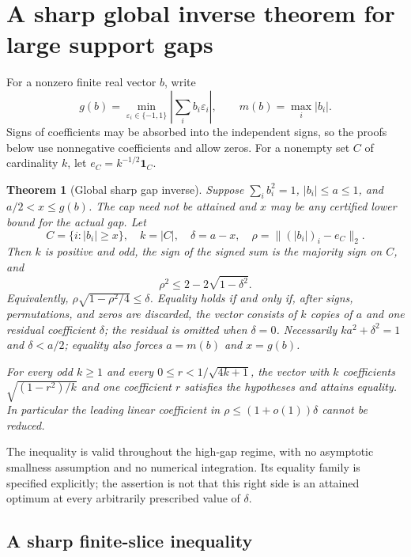 \documentclass[11pt]{article}
\newtheorem{theorem}{Theorem}[section]
\theoremstyle{remark}\newtheorem{remark}[theorem]{Remark}
\begin{document}
\section{A sharp global inverse theorem for large support gaps}
\label{sec:sharp-gap-rigidity}

For a nonzero finite real vector $b$, write
\[
 g(b)=\min_{\varepsilon_i\in\{-1,1\}}\left|\sum_i b_i\varepsilon_i\right|,
 \qquad m(b)=\max_i|b_i|.
\]
Signs of coefficients may be absorbed into the independent signs, so the
proofs below use nonnegative coefficients and allow zeros.  For a nonempty
set $C$ of cardinality $k$, let $e_C=k^{-1/2}\mathbf1_C$.

\begin{theorem}[Global sharp gap inverse]\label{thm:sharp-gap-inverse}
Suppose $\sum_i b_i^2=1$, $|b_i|\le a\le1$, and
$a/2<x\le g(b)$. The cap need not be attained and $x$ may be any
certified lower bound for the actual gap. Let
\[
 C=\{i:|b_i|\ge x\},\quad k=|C|,\quad \delta=a-x,
 \quad \rho=\bigl\|(|b_i|)_i-e_C\bigr\|_2.
\]
Then $k$ is positive and odd, the sign of the signed sum is the majority
sign on $C$, and
\begin{equation}\label{eq:sharp-gap-inverse}
 \rho^2\le 2-2\sqrt{1-\delta^2}.
\end{equation}
Equivalently,
$\rho\sqrt{1-\rho^2/4}\le\delta$.
Equality holds if and only if, after signs, permutations, and zeros are
discarded, the vector consists of $k$ copies of $a$ and one residual
coefficient $\delta$; the residual is omitted when $\delta=0$.
Necessarily $ka^2+\delta^2=1$ and $\delta<a/2$; equality also forces
$a=m(b)$ and $x=g(b)$.

For every odd $k\ge1$ and every $0\le r<1/\sqrt{4k+1}$, the vector
with $k$ coefficients $\sqrt{(1-r^2)/k}$ and one coefficient $r$
satisfies the hypotheses and attains equality.  In particular the leading
linear coefficient in $\rho\le(1+o(1))\delta$ cannot be reduced.
\end{theorem}

The inequality is valid throughout the high-gap regime, with no asymptotic
smallness assumption and no numerical integration.  Its equality family
is specified explicitly; the assertion is not that this right side is an
attained optimum at every arbitrarily prescribed value of $\delta$.

\subsection{A sharp finite-slice inequality}
\end{document}
